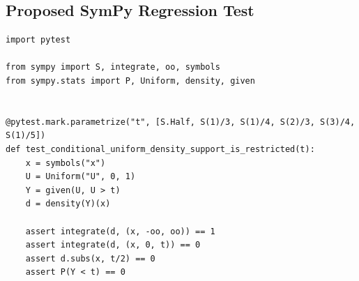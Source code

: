 \documentclass[11pt]{article}
\begin{document}
\subsection{Proposed SymPy Regression Test}

\medskip

\begin{lstlisting}[style=bugpython]
import pytest

from sympy import S, integrate, oo, symbols
from sympy.stats import P, Uniform, density, given


@pytest.mark.parametrize("t", [S.Half, S(1)/3, S(1)/4, S(2)/3, S(3)/4, S(1)/5])
def test_conditional_uniform_density_support_is_restricted(t):
    x = symbols("x")
    U = Uniform("U", 0, 1)
    Y = given(U, U > t)
    d = density(Y)(x)

    assert integrate(d, (x, -oo, oo)) == 1
    assert integrate(d, (x, 0, t)) == 0
    assert d.subs(x, t/2) == 0
    assert P(Y < t) == 0
\end{lstlisting}
\end{document}
